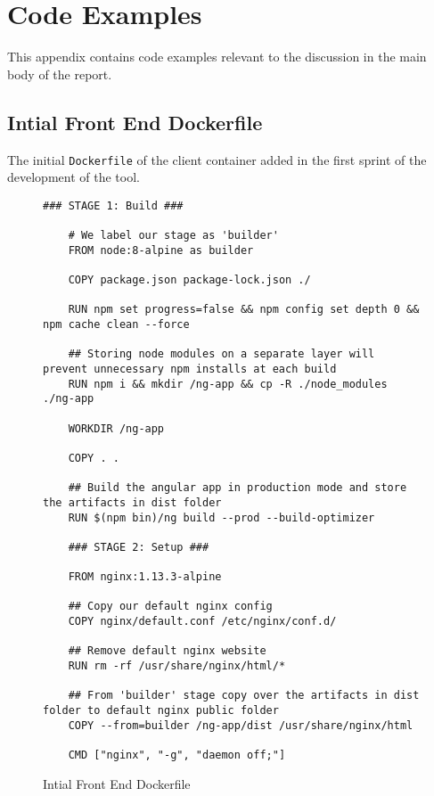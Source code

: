 \chapter{Code Examples}
\label{chap:codesamples}

This appendix contains code examples relevant to the discussion in the main body of the
report.

\newpage
\section{Intial Front End Dockerfile}
The initial \texttt{Dockerfile} of the client container added in the first sprint of
the development of the tool.

\begin{figure}[ht]
  \begin{lstlisting}[basicstyle=\small, breaklines=true]
    ### STAGE 1: Build ###

    # We label our stage as 'builder'
    FROM node:8-alpine as builder

    COPY package.json package-lock.json ./

    RUN npm set progress=false && npm config set depth 0 && npm cache clean --force

    ## Storing node modules on a separate layer will prevent unnecessary npm installs at each build
    RUN npm i && mkdir /ng-app && cp -R ./node_modules ./ng-app

    WORKDIR /ng-app

    COPY . .

    ## Build the angular app in production mode and store the artifacts in dist folder
    RUN $(npm bin)/ng build --prod --build-optimizer

    ### STAGE 2: Setup ###

    FROM nginx:1.13.3-alpine

    ## Copy our default nginx config
    COPY nginx/default.conf /etc/nginx/conf.d/

    ## Remove default nginx website
    RUN rm -rf /usr/share/nginx/html/*

    ## From 'builder' stage copy over the artifacts in dist folder to default nginx public folder
    COPY --from=builder /ng-app/dist /usr/share/nginx/html

    CMD ["nginx", "-g", "daemon off;"]
  \end{lstlisting}
  \caption{Intial Front End Dockerfile}
  \label{sample:clientdocker}
\end{figure}

